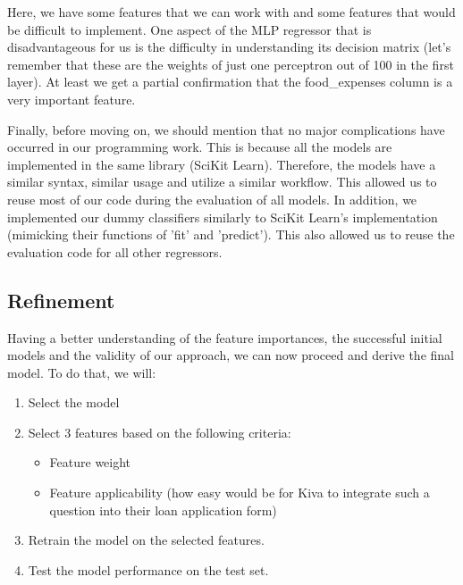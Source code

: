 \documentclass{article}
\begin{document}
Here, we have some features that we can work with and some features that would be difficult to implement. One aspect of the MLP regressor that is disadvantageous for us is the difficulty in understanding its decision matrix (let's remember that these are the weights of just one perceptron out of 100 in the first layer). At least we get a partial confirmation that the food\_expenses column is a very important feature.

Finally, before moving on, we should mention that no major complications have occurred in our programming work. This is because all the models are implemented in the same library (SciKit Learn). Therefore, the models have a similar syntax, similar usage and utilize a similar workflow. This allowed us to reuse most of our code during the evaluation of all models. In addition, we implemented our dummy classifiers similarly to SciKit Learn's implementation (mimicking their functions of 'fit' and 'predict'). This also allowed us to reuse the evaluation code for all other regressors.

\subsection{Refinement}
Having a better understanding of the feature importances, the successful initial models and the validity of our approach, we can now proceed and derive the final model. To do that, we will:

\begin{enumerate}
  \item Select the model
  \item Select 3 features based on the following criteria:
  \begin{itemize}
    \item Feature weight
    \item Feature applicability (how easy would be for Kiva to integrate such a question into their loan application form)
  \end{itemize}
  \item Retrain the model on the selected features.
  \item Test the model performance on the test set.
\end{enumerate}
\end{document}
